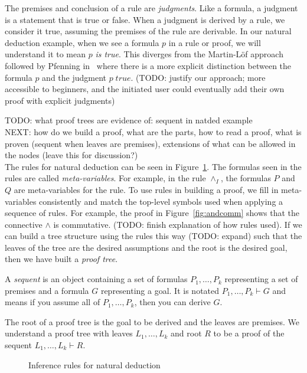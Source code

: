 \documentclass[conference]{IEEEtran}
\begin{document}
The premises and conclusion of a rule are \textit{judgments}. Like a formula, a judgment is a statement that is true or false. When a judgment is derived by a rule, we consider it true, assuming the premises of the rule are derivable. In our natural deduction example, when we see a formula $p$ in a rule or proof, we will understand it to mean $p$ \textit{is true}. This diverges from the Martin-L{\"o}f approach followed by Pfenning in~\cite{natded-pfenning} where there is a more explicit distinction between the formula $p$ and the judgment $p \; \mathit{true}$. (TODO: justify our approach; more accessible to beginners, and the initiated user could eventually add their own proof with explicit judgments)

TODO: what proof trees are evidence of: sequent in natded example \\

NEXT: how do we build a proof, what are the parts, how to read a proof, what is proven (sequent when leaves are premises), extensions of what can be allowed in the nodes (leave this for discussion?) \\

The rules for natural deduction can be seen in Figure~\ref{fig:natdedrules}. The formulas seen in the rules are called \textit{meta-variables}. For example, in the rule $\wedge_I$, the formulas $P$ and $Q$ are meta-variables for the rule. To use rules in building a proof, we fill in meta-variables consistently and match the top-level symbols used when applying a sequence of rules. For example, the proof in Figure~\ref{fig:andcomm} shows that the connective $\wedge$ is commutative. (TODO: finish explanation of how rules used). If we can build a tree structure using the rules this way (TODO: expand) such that the leaves of the tree are the desired assumptions and the root is the desired goal, then we have built a \textit{proof tree}.

A \textit{sequent} is an object containing a set of formulas $P_1, \dots, P_k$ representing a set of premises and a formula $G$ representing a goal. It is notated $P_1, \dots, P_k \vdash G$ and means if you assume all of $P_1, \dots, P_k$, then you can derive $G$.

The root of a proof tree is the goal to be derived and the leaves are premises. We understand a proof tree with leaves $L_1, \dots, L_k$ and root $R$ to be a proof of the sequent $L_1, \dots, L_k \vdash R$.

\begin{figure}

\caption{Inference rules for natural deduction}
\label{fig:natdedrules}
\end{figure}
\end{document}
